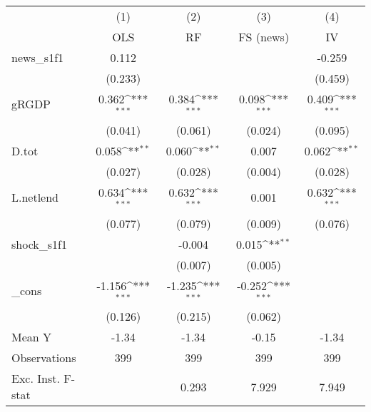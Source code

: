 {
\def\sym#1{\ifmmode^{#1}\else\(^{#1}\)\fi}
\begin{tabular}{l*{4}{c}}
\toprule
            &\multicolumn{1}{c}{(1)}&\multicolumn{1}{c}{(2)}&\multicolumn{1}{c}{(3)}&\multicolumn{1}{c}{(4)}\\
            &\multicolumn{1}{c}{OLS}&\multicolumn{1}{c}{RF}&\multicolumn{1}{c}{FS (news)}&\multicolumn{1}{c}{IV}\\
\midrule
news\_s1f1   &       0.112         &                     &                     &      -0.259         \\
            &     (0.233)         &                     &                     &     (0.459)         \\
\addlinespace
gRGDP       &       0.362\sym{***}&       0.384\sym{***}&       0.098\sym{***}&       0.409\sym{***}\\
            &     (0.041)         &     (0.061)         &     (0.024)         &     (0.095)         \\
\addlinespace
D.tot       &       0.058\sym{**} &       0.060\sym{**} &       0.007         &       0.062\sym{**} \\
            &     (0.027)         &     (0.028)         &     (0.004)         &     (0.028)         \\
\addlinespace
L.netlend   &       0.634\sym{***}&       0.632\sym{***}&       0.001         &       0.632\sym{***}\\
            &     (0.077)         &     (0.079)         &     (0.009)         &     (0.076)         \\
\addlinespace
shock\_s1f1  &                     &      -0.004         &       0.015\sym{**} &                     \\
            &                     &     (0.007)         &     (0.005)         &                     \\
\addlinespace
\_cons      &      -1.156\sym{***}&      -1.235\sym{***}&      -0.252\sym{***}&                     \\
            &     (0.126)         &     (0.215)         &     (0.062)         &                     \\
\midrule
Mean Y      &       -1.34         &       -1.34         &       -0.15         &       -1.34         \\
Observations&         399         &         399         &         399         &         399         \\
Exc. Inst. F-stat&                     &       0.293         &       7.929         &       7.949         \\
\bottomrule
\end{tabular}
}
